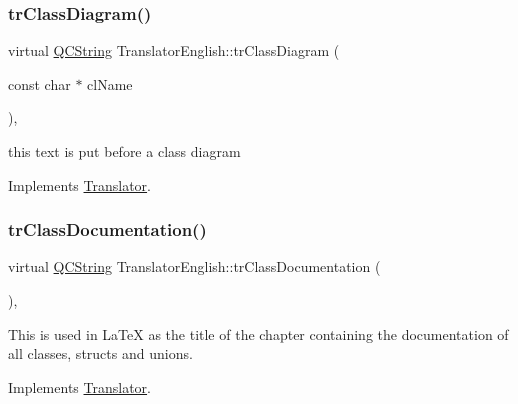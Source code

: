 \mbox{\label{class_translator_english_aadab21b2cb2ea91d3db3b0637c07a3b7}} 
\subsubsection{\texorpdfstring{trClassDiagram()}{trClassDiagram()}}
{\footnotesize\ttfamily virtual \mbox{\hyperlink{class_q_c_string}{Q\+C\+String}} Translator\+English\+::tr\+Class\+Diagram (\begin{DoxyParamCaption}\item[{const char $\ast$}]{cl\+Name }\end{DoxyParamCaption})\hspace{0.3cm}{\ttfamily [inline]}, {\ttfamily [virtual]}}

this text is put before a class diagram 

Implements \mbox{\hyperlink{class_translator}{Translator}}.

\mbox{\label{class_translator_english_afc84e10e543306cc23a1278b2a8babac}} 
\subsubsection{\texorpdfstring{trClassDocumentation()}{trClassDocumentation()}}
{\footnotesize\ttfamily virtual \mbox{\hyperlink{class_q_c_string}{Q\+C\+String}} Translator\+English\+::tr\+Class\+Documentation (\begin{DoxyParamCaption}{ }\end{DoxyParamCaption})\hspace{0.3cm}{\ttfamily [inline]}, {\ttfamily [virtual]}}

This is used in La\+TeX as the title of the chapter containing the documentation of all classes, structs and unions. 

Implements \mbox{\hyperlink{class_translator}{Translator}}.

\mbox{\label{class_translator_english_a1ed82dee3a0fb5ceb0edac43887998ca}} 
